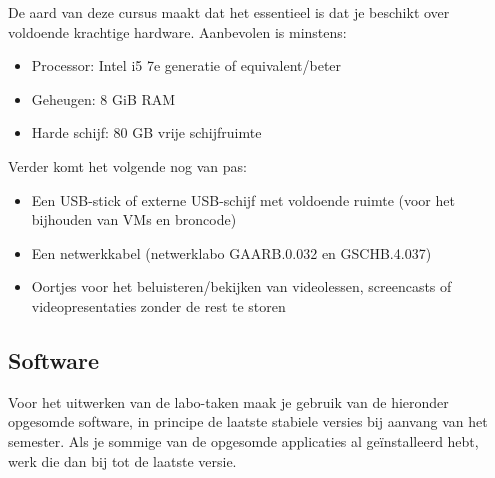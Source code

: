 De aard van deze cursus maakt dat het essentieel is dat je beschikt over voldoende krachtige hardware. Aanbevolen is minstens:

\begin{itemize}
  \item Processor: Intel i5 7e generatie of equivalent/beter
  \item Geheugen: 8 GiB RAM
  \item Harde schijf: 80 GB vrije schijfruimte
\end{itemize}

Verder komt het volgende nog van pas:

\begin{itemize}
  \item Een USB-stick of externe USB-schijf met voldoende ruimte (voor het bijhouden van VMs en broncode)
  \item Een netwerkkabel (netwerklabo GAARB.0.032 en GSCHB.4.037)
  \item Oortjes voor het beluisteren/bekijken van videolessen, screencasts of videopresentaties zonder de rest te storen
\end{itemize}

\subsection{Software}
\label{ssec:software}

Voor het uitwerken van de labo-taken maak je gebruik van de hieronder opgesomde software, in principe de laatste stabiele versies bij aanvang van het semester. Als je sommige van de opgesomde applicaties al geïnstalleerd hebt, werk die dan bij tot de laatste versie.

